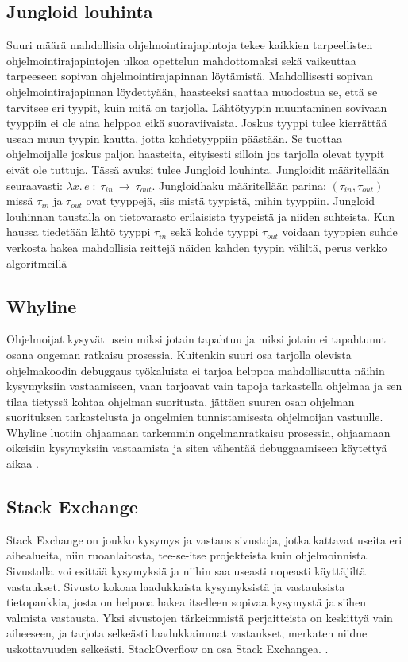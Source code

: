 \documentclass[finnish]{../tktltiki2}
\theoremstyle{definition}
\theoremstyle{remark}
\begin{document}
\subsection{Jungloid louhinta}
Suuri määrä mahdollisia ohjelmointirajapintoja tekee kaikkien tarpeellisten ohjelmointirajapintojen ulkoa opettelun mahdottomaksi sekä vaikeuttaa tarpeeseen sopivan ohjelmointirajapinnan löytämistä. Mahdollisesti sopivan ohjelmointirajapinnan löydettyään, haasteeksi saattaa muodostua se, että se tarvitsee eri tyypit, kuin mitä on tarjolla. Lähtötyypin muuntaminen sovivaan tyyppiin ei ole aina helppoa eikä suoraviivaista. Joskus tyyppi tulee kierrättää usean muun tyypin kautta, jotta kohdetyyppiin päästään. Se tuottaa ohjelmoijalle joskus paljon haasteita, eityisesti silloin jos tarjolla olevat tyypit eivät ole tuttuja. Tässä avuksi tulee Jungloid louhinta.
Jungloidit määritellään seuraavasti: $ \lambda x.\, e\; :\; \tau_{in}\:\to\:\tau_{out}$. Jungloidhaku määritellään parina: $(\tau_{in}, \tau_{out})$ missä $\tau_{in}$ ja $\tau_{out}$ ovat tyyppejä, siis mistä tyypistä, mihin tyyppiin. Jungloid louhinnan taustalla on tietovarasto erilaisista tyypeistä ja niiden suhteista. Kun haussa tiedetään lähtö tyyppi $\tau_{in}$ sekä kohde tyyppi $\tau_{out}$ voidaan tyyppien suhde verkosta hakea mahdollisia reittejä näiden kahden tyypin väliltä, perus verkko algoritmeillä \cite{jungloid-mining}
\subsection{Whyline}
Ohjelmoijat kysyvät usein miksi jotain tapahtuu ja miksi jotain ei tapahtunut osana ongeman ratkaisu prosessia. Kuitenkin suuri osa tarjolla olevista ohjelmakoodin debuggaus työkaluista ei tarjoa helppoa mahdollisuutta näihin kysymyksiin vastaamiseen, vaan tarjoavat vain tapoja tarkastella ohjelmaa ja sen tilaa tietyssä kohtaa ohjelman suoritusta, jättäen suuren osan ohjelman suorituksen tarkastelusta ja ongelmien tunnistamisesta ohjelmoijan vastuulle. Whyline luotiin ohjaamaan tarkemmin ongelmanratkaisu prosessia, ohjaamaan oikeisiin kysymyksiin vastaamista ja siten vähentää debuggaamiseen käytettyä aikaa \cite{whyline}.
\subsection{Stack Exchange}
Stack Exchange on joukko kysymys ja vastaus sivustoja, jotka kattavat useita eri aihealueita, niin ruoanlaitosta, tee-se-itse projekteista kuin ohjelmoinnista. Sivustolla voi esittää kysymyksiä ja niihin saa useasti nopeasti käyttäjiltä vastaukset. Sivusto kokoaa laadukkaista kysymyksistä ja vastauksista tietopankkia, josta on helpooa hakea itselleen sopivaa kysymystä ja siihen valmista vastausta. Yksi sivustojen tärkeimmistä perjaitteista on keskittyä vain aiheeseen, ja tarjota selkeästi laadukkaimmat vastaukset, merkaten niidne uskottavuuden selkeästi.
StackOverflow on osa Stack Exchangea. \cite{social-networking-meets-se}.
\end{document}
